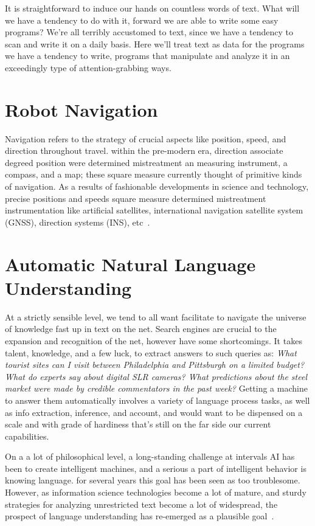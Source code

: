 It is straightforward to induce our hands on countless words of text. What will we have a tendency to do with it, forward we are able to write some easy programs? We're all terribly accustomed to text, since we have a tendency to scan and write it on a daily basis. Here we'll treat text as data for the programs we have a tendency to write, programs that manipulate and analyze it in an exceedingly type of attention-grabbing ways.
\section{Robot Navigation}
Navigation refers to the strategy of crucial aspects like position, speed, and direction throughout travel. within the pre-modern era, direction associate degreed position were determined mistreatment an measuring instrument, a compass, and a map; these square measure currently thought of primitive kinds of navigation. As a results of fashionable developments in science and technology, precise positions and speeds square measure determined mistreatment instrumentation like artificial satellites, international navigation satellite system (GNSS), direction systems (INS), etc~\cite{NAV}.

\section{Automatic Natural Language Understanding}
At a strictly sensible level, we tend to all want facilitate to navigate the universe of knowledge fast up in text on the net. Search engines are crucial to the expansion and recognition of the net, however have some shortcomings. It takes talent, knowledge, and a few luck, to extract answers to such queries as: \emph{What tourist sites can I visit between Philadelphia and Pittsburgh on a limited budget? What do experts say about digital SLR cameras? What predictions about the steel market were made by credible commentators in the past week?} Getting a machine to answer them automatically involves a variety of language process tasks, as well as info extraction, inference, and account, and would want to be dispensed on a scale and with grade of hardiness that's still on the far side our current capabilities.

On a a lot of philosophical level, a long-standing challenge at intervals AI has been to create intelligent machines, and a serious a part of intelligent behavior is knowing language. for several years this goal has been seen as too troublesome. However, as information science technologies become a lot of mature, and sturdy strategies for analyzing unrestricted text become a lot of widespread, the prospect of language understanding has re-emerged as a plausible goal~\cite{NLPbook}.

